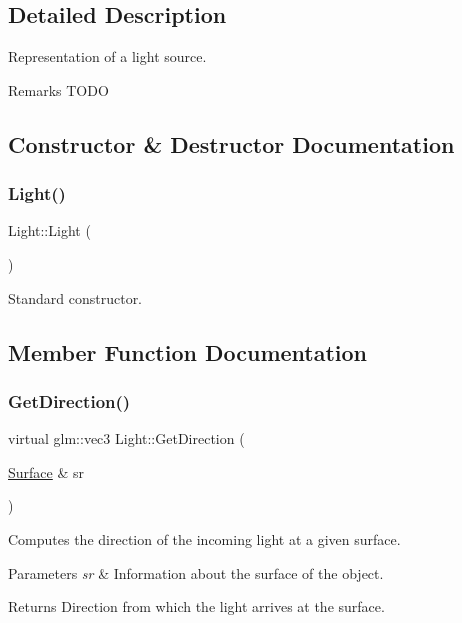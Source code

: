 \subsection{Detailed Description}
Representation of a light source. \begin{DoxyRemark}{Remarks}
T\+O\+DO 
\end{DoxyRemark}


\subsection{Constructor \& Destructor Documentation}
\hypertarget{class_light_aeb5df09a25a32f19fdffa761268ba24f}{}\label{class_light_aeb5df09a25a32f19fdffa761268ba24f} 
\subsubsection{\texorpdfstring{Light()}{Light()}}
{\footnotesize\ttfamily Light\+::\+Light (\begin{DoxyParamCaption}{ }\end{DoxyParamCaption})}

Standard constructor. 

\subsection{Member Function Documentation}
\hypertarget{class_light_a62c5f73131ca1cdd6b2477f36c242482}{}\label{class_light_a62c5f73131ca1cdd6b2477f36c242482} 
\subsubsection{\texorpdfstring{Get\+Direction()}{GetDirection()}}
{\footnotesize\ttfamily virtual glm\+::vec3 Light\+::\+Get\+Direction (\begin{DoxyParamCaption}\item[{\hyperlink{class_surface}{Surface} \&}]{sr }\end{DoxyParamCaption})\hspace{0.3cm}{\ttfamily [pure virtual]}}

Computes the direction of the incoming light at a given surface. 
\begin{DoxyParams}{Parameters}
{\em sr} & Information about the surface of the object. \\
\hline
\end{DoxyParams}
\begin{DoxyReturn}{Returns}
Direction from which the light arrives at the surface. 
\end{DoxyReturn}



